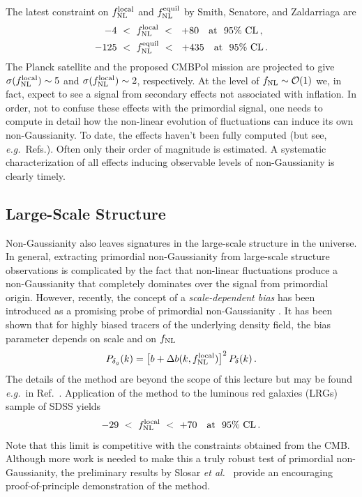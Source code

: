 \documentclass[12pt,letterpaper,rotate]{article}
\def\beq{\begin{equation}}
\def\eeq{\end{equation}}
\begin{document}
{The latest constraint on $f_{\rm NL}^{\rm local}$ and $f_{\rm NL}^{\rm equil}$ by Smith, Senatore, and Zaldarriaga \cite{Smith:2009jr, Senatore:2009gt} are
\begin{align}
- 4& \ < \ f_{\rm NL}^{\rm local} \ < \ \ +80 \quad {\rm at} \ \ 95\% \ {\rm CL}\, , \\
- 125& \ < \ f_{\rm NL}^{\rm equil} \ < \ \ +435 \quad {\rm at} \ \ 95\% \ {\rm CL}\, .
\end{align}
The Planck satellite and the proposed CMBPol mission are projected to give $\sigma(f_{\rm NL}^{\rm local}) \sim 5$ and $\sigma(f_{\rm NL}^{\rm local}) \sim 2$, respectively.
At the level of $f_{\rm NL} \sim {\cal O}(1)$ we, in fact, expect to see a signal from secondary effects not associated with inflation. In order, not to confuse these effects with the primordial signal, one needs to compute in detail how  
the non-linear evolution of fluctuations can induce its own non-Gaussianity.
To date, the effects haven't been fully computed (but see, {\it e.g.}~Refs.\cite{BMR1, BMR2, Senatore:2008wk}).
Often only their order of magnitude is estimated. A systematic characterization of all effects inducing observable levels of non-Gaussianity is clearly timely.




\subsection{Large-Scale Structure}

Non-Gaussianity also leaves signatures in the large-scale structure in the universe.
In general, extracting primordial non-Gaussianity from large-scale structure observations is complicated by the fact that non-linear fluctuations produce a non-Gaussianity that completely dominates over the signal from primordial origin.
However, recently, the concept of a {\it scale-dependent bias} has been introduced as  a promising probe of primordial non-Gaussianity \cite{Dalal:2007cu, Slosar:2008hx}.
It has been shown  \cite{Dalal:2007cu, Slosar:2008hx} that for highly biased tracers of the underlying density field, the bias parameter depends on scale and on $f_{\rm NL}$
\beq
P_{\delta_g}(k) = \left[b+ \Delta b(k, f_{\rm NL}^{\rm local})\right]^2 P_\delta(k)\, .
\eeq
The details of the method are beyond the scope of this lecture but may be found {\it e.g.}~in Ref.~\cite{Slosar:2008hx}.
Application of the method to the luminous red galaxies (LRGs) sample of SDSS yields~\cite{Slosar:2008hx} 
\beq
- 29 \ < \ f_{\rm NL}^{\rm local} \ < \ + 70 \quad {\rm at} \ \ 95\% \ {\rm CL}\, .
\eeq
Note that this limit is competitive with the constraints obtained from the CMB.
Although more work is needed to make this a truly robust test of primordial non-Gaussianity, the preliminary results by Slosar {\it et al.}~\cite{Slosar:2008hx} provide an encouraging proof-of-principle demonstration of the method.

}
\end{document}

